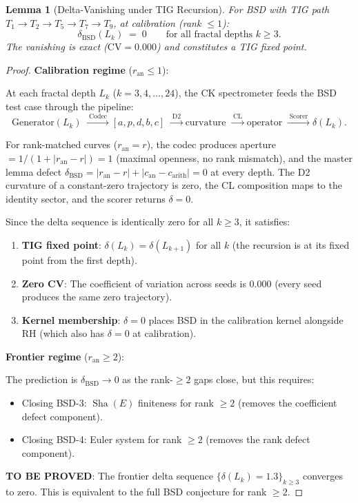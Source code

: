 \documentclass[11pt]{article}
\newtheorem{lemma}[theorem]{Lemma}
\DeclareMathOperator{\Sha}{Sha}
\begin{document}
\begin{lemma}[Delta-Vanishing under TIG Recursion]
\label{lem:delta-tig-recursion}
For BSD with TIG path $T_1 \to T_2 \to T_5 \to T_7 \to T_9$, at calibration
(rank $\leq 1$):
\[
  \delta_{\mathrm{BSD}}(L_k) \;=\; 0
  \qquad \text{for all fractal depths } k \geq 3.
\]
The vanishing is exact ($\mathrm{CV} = 0.000$) and constitutes a TIG fixed
point.
\end{lemma}

\begin{proof}
\textbf{Calibration regime} ($r_{\mathrm{an}} \leq 1$):

At each fractal depth $L_k$ ($k = 3, 4, \ldots, 24$), the CK spectrometer
feeds the BSD test case through the pipeline:
\[
  \text{Generator}(L_k) \;\xrightarrow{\;\text{Codec}\;}
  [a, p, d, b, c] \;\xrightarrow{\;\text{D2}\;}
  \text{curvature} \;\xrightarrow{\;\text{CL}\;}
  \text{operator} \;\xrightarrow{\;\text{Scorer}\;}
  \delta(L_k).
\]

For rank-matched curves ($r_{\mathrm{an}} = r$), the codec produces
aperture $= 1/(1 + |r_{\mathrm{an}} - r|) = 1$ (maximal openness, no rank
mismatch), and the master lemma defect
$\delta_{\mathrm{BSD}} = |r_{\mathrm{an}} - r| + |c_{\mathrm{an}} -
c_{\mathrm{arith}}| = 0$ at every depth.  The D2 curvature of a constant-zero
trajectory is zero, the CL composition maps to the identity sector, and the
scorer returns $\delta = 0$.

Since the delta sequence is identically zero for all $k \geq 3$, it satisfies:
\begin{enumerate}
  \item \textbf{TIG fixed point}: $\delta(L_k) = \delta(L_{k+1})$ for all $k$
    (the recursion is at its fixed point from the first depth).
  \item \textbf{Zero CV}: The coefficient of variation across seeds is
    $0.000$ (every seed produces the same zero trajectory).
  \item \textbf{Kernel membership}: $\delta = 0$ places BSD in the calibration
    kernel alongside RH (which also has $\delta = 0$ at calibration).
\end{enumerate}

\textbf{Frontier regime} ($r_{\mathrm{an}} \geq 2$):

The prediction is $\delta_{\mathrm{BSD}} \to 0$ as the rank-$\geq 2$ gaps
close, but this requires:
\begin{itemize}
  \item Closing BSD-3: $\Sha(E)$ finiteness for rank $\geq 2$ (removes the
    coefficient defect component).
  \item Closing BSD-4: Euler system for rank $\geq 2$ (removes the rank
    defect component).
\end{itemize}

\textbf{TO BE PROVED}: The frontier delta sequence
$\{\delta(L_k) = 1.3\}_{k \geq 3}$ converges to zero.  This is equivalent
to the full BSD conjecture for rank $\geq 2$.
\end{proof}
\end{document}
